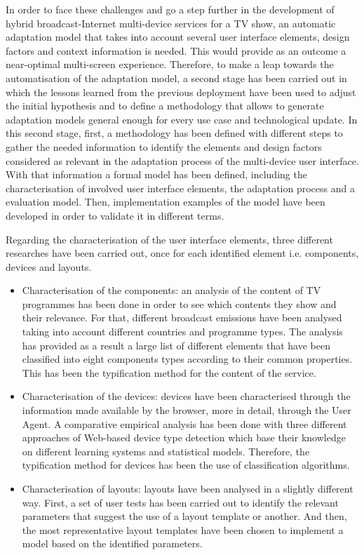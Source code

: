 In order to face these challenges and go a step further in the development of hybrid broadcast-Internet multi-device services for a TV show, an automatic adaptation model that takes into account several user interface elements, design factors and context information is needed. This would provide as an outcome a near-optimal multi-screen experience. Therefore, to make a leap towards the automatisation of the adaptation model, a second stage has been carried out in which the lessons learned from the previous deployment have been used to adjust the initial hypothesis and to define a methodology that allows to generate adaptation models general enough for every use case and technological update. In this second stage, first, a methodology has been defined with different steps to gather the needed information to identify the elements and design factors considered as relevant in the adaptation process of the multi-device user interface. With that information a formal model has been defined, including the characterisation of involved user interface elements, the adaptation process and a evaluation model. Then, implementation examples of the model have been developed in order to validate it in different terms. 

Regarding the characterisation of the user interface elements, three different researches have been carried out, once for each identified element i.e. components, devices and layouts. 
\begin{itemize}
	\item Characterisation of the components: an analysis of the content of TV programmes has been done in order to see which contents they show and their relevance. For that, different broadcast emissions have been analysed taking into account different countries and programme types. The analysis has provided as a result a large list of different elements that have been classified into eight components types according to their common properties. This has been the typification method for the content of the service.
	\item Characterisation of the devices: devices have been characterised through the information made available by the browser, more in detail, through the User Agent. A comparative empirical analysis has been done with three different approaches of Web-based device type detection which base their knowledge on different learning systems and statistical models. Therefore, the typification method for devices has been the use of classification algorithms.
	\item Characterisation of layouts: layouts have been analysed in a slightly different way. First, a set of user tests has been carried out to identify the relevant parameters that suggest the use of a layout template or another. And then, the most representative layout templates have been chosen to implement a model based on the identified parameters. 
\end{itemize}

